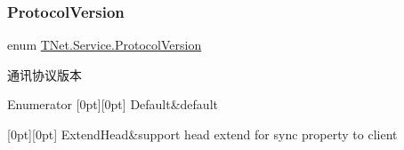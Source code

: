 \subsubsection{\texorpdfstring{Protocol\+Version}{ProtocolVersion}}
{\footnotesize\ttfamily enum \mbox{\hyperlink{namespace_t_net_1_1_service_a6651119df6dac62b849ed58cf7ece2bd}{T\+Net.\+Service.\+Protocol\+Version}}\hspace{0.3cm}{\ttfamily [strong]}}



通讯协议版本 

\begin{DoxyEnumFields}{Enumerator}
[0pt][0pt]{}\mbox{\label{namespace_t_net_1_1_service_a6651119df6dac62b849ed58cf7ece2bda7a1920d61156abc05a60135aefe8bc67}} 
Default&default \\
\hline

[0pt][0pt]{}\mbox{\label{namespace_t_net_1_1_service_a6651119df6dac62b849ed58cf7ece2bda523e459574b52278a2638a513bac37ef}} 
Extend\+Head&support head extend for sync property to client \\
\hline

\end{DoxyEnumFields}
